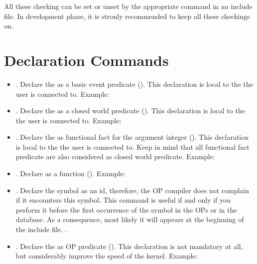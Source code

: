 All these checking can be set or unset by the appropriate command in an include
file. In development phase, it is stronly recommended to keep all these checkings
on.

\section{\CPK{} Declaration Commands}

\begin{itemize}

\item {}. Declare the  as a basic
event predicate (). This declaration is local to the
\CPK{} the user is connected to.\*
Example: 

\item {}. Declare the  as a closed
world predicate (). This declaration is local to
the \CPK{} the user is connected to. \*
Example: 

\item {}. Declare the
 as functional fact for the argument integer (). This declaration is local to the \CPK{} the user is connected
to. Keep in mind that all functional fact predicate are also considered as
closed world predicate.\*
Example: \*

\item {}. Declare  as a
function ().\*
Example: \*

\item {}. Declare the symbol as an id, therefore, the OP
compiler does not complain if it encounters this symbol. This command is
useful if and only if you perform it before the first occurrence of the
symbol in the OPs or in the database. As a consequence, most likely it
will appears at the beginning of the include file. .

\item {}. Declare the
 as OP predicate (). This declaration is not
mandatory at all, but considerably improve the speed of the kernel.\*
Example: \*


\end{itemize}
